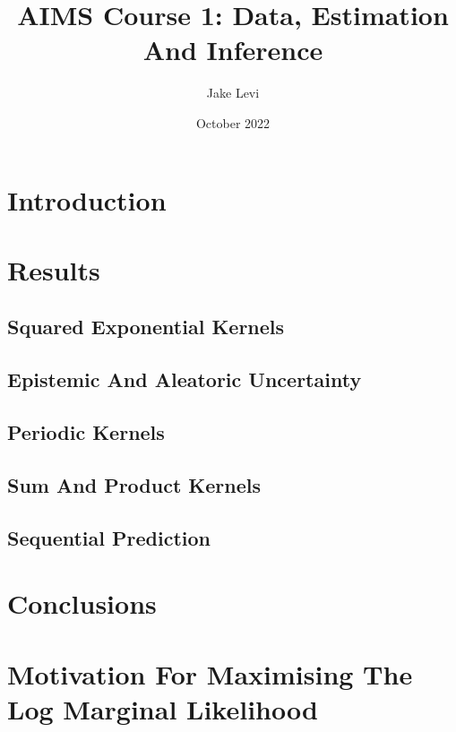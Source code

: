 \documentclass{article}
\title{AIMS Course 1: Data, Estimation And Inference}
\author{Jake Levi}
\date{October 2022}
\begin{document}
\maketitle
\section{Introduction} \label{section:intro}


\section{Results}
\subsection{Squared Exponential Kernels} \label{section:sqe}

\subsection{Epistemic And Aleatoric Uncertainty} \label{section:uncertainty}


\subsection{Periodic Kernels}


\subsection{Sum And Product Kernels}

\subsection{Sequential Prediction}


\section{Conclusions}



\appendix
\section{Motivation For Maximising The Log Marginal Likelihood}\label{appendix:why_lml}





\end{document}
